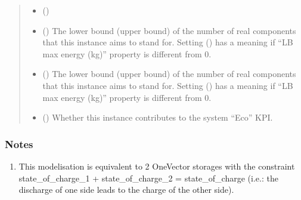 \documentclass[letterpaper,10pt,english]{sphinxmanual}
\begin{document}
\begin{fulllineitems}
\begin{fulllineitems}
\begin{quote}
\begin{description}
\begin{itemize}
\item {} 
\sphinxAtStartPar
{} (\sphinxstyleliteralemphasis{\sphinxupquote{, }}) \textendash{} 

\item {} 
\sphinxAtStartPar
{} (\sphinxstyleliteralemphasis{\sphinxupquote{, }}\sphinxstyleliteralemphasis{\sphinxupquote{, }}) \textendash{} The lower bound (upper bound) of the number of real components that this instance aims to stand for.
Setting  () has a meaning if “LB max energy (kg)” property is
different from 0.

\item {} 
\sphinxAtStartPar
{} (\sphinxstyleliteralemphasis{\sphinxupquote{, }}\sphinxstyleliteralemphasis{\sphinxupquote{, }}) \textendash{} The lower bound (upper bound) of the number of real components that this instance aims to stand for.
Setting  () has a meaning if “LB max energy (kg)” property is
different from 0.

\item {} 
\sphinxAtStartPar
{} (\sphinxstyleliteralemphasis{\sphinxupquote{, }}\sphinxstyleliteralemphasis{\sphinxupquote{, }}) \textendash{} Whether this instance contributes to the system “Eco” KPI.

\end{itemize}

\end{description}\end{quote}
\subsubsection*{Notes}
\begin{enumerate}
%
\item {} 
\sphinxAtStartPar
This modelisation is equivalent to 2 OneVector storages with the constraint
state\_of\_charge\_1 + state\_of\_charge\_2 = state\_of\_charge
(i.e.: the discharge of one side leads to the charge of the other side).


\end{enumerate}
\end{fulllineitems}
\end{fulllineitems}
\end{document}
